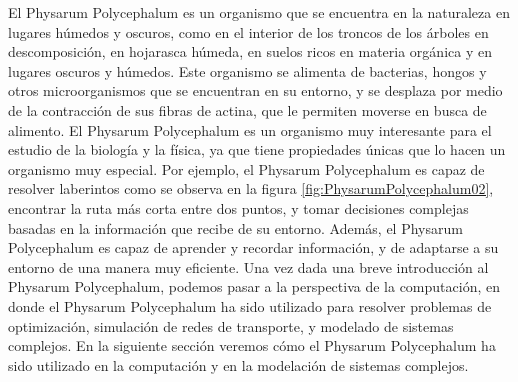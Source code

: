     \vskip 0.5cm
    El Physarum Polycephalum es un organismo que se encuentra en la naturaleza en lugares h\'umedos y oscuros, 
        como en el interior de los troncos de los \'arboles en descomposici\'on, en hojarasca h\'umeda, en suelos 
        ricos en materia org\'anica y en lugares oscuros y h\'umedos. Este organismo se alimenta de bacterias, 
        hongos y otros microorganismos que se encuentran en su entorno, y se desplaza por medio de la contracci\'on 
        de sus fibras de actina, que le permiten moverse en busca de alimento.\cite{Dee1960}
    \vskip 0.5cm
    El Physarum Polycephalum es un organismo muy interesante para el estudio de la biolog\'ia y la f\'isica, 
        ya que tiene propiedades \'unicas que lo hacen un organismo muy especial. Por ejemplo, el Physarum Polycephalum 
        es capaz de resolver laberintos como se observa en la figura \ref{fig:PhysarumPolycephalum02}, encontrar la ruta m\'as corta entre dos puntos, y tomar decisiones complejas 
        basadas en la informaci\'on que recibe de su entorno. Adem\'as, el Physarum Polycephalum es capaz de aprender 
        y recordar informaci\'on, y de adaptarse a su entorno de una manera muy eficiente.
    \vskip 0.5cm
    Una vez dada una breve introducci\'on al Physarum Polycephalum, podemos pasar a la perspectiva de la computaci\'on, 
        en donde el Physarum Polycephalum ha sido utilizado para resolver problemas de optimizaci\'on, simulaci\'on 
        de redes de transporte, y modelado de sistemas complejos. En la siguiente secci\'on veremos c\'omo el Physarum 
        Polycephalum ha sido utilizado en la computaci\'on y en la modelaci\'on de sistemas complejos.
    